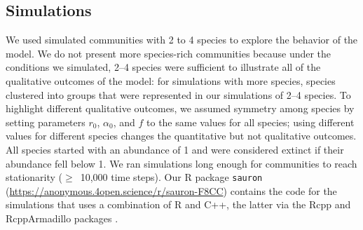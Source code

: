 \subsection*{Simulations}

We used simulated communities with 2 to 4 species to explore the behavior 
of the model. We do not present more species-rich communities because under 
the conditions we simulated, 2--4 species were sufficient to illustrate all 
of the qualitative outcomes of the model: for simulations with more species,
species clustered into groups that were represented in our simulations of 
2--4 species. To highlight different qualitative outcomes, we assumed
symmetry among species by setting parameters $r_{0}$, $\alpha_{0}$,
and $f$ to the same values for all species; using different values for
different species changes the quantitative but not qualitative outcomes.
All species started with an abundance of 1 and were considered extinct
if their abundance fell below 1. We ran simulations long enough for
communities to reach stationarity ($\ge$~10,000 time steps). 
Our R package
\texttt{sauron}
(\url{https://anonymous.4open.science/r/sauron-F8CC}) 
contains the code for the simulations that uses a combination of R
\citep{RCoreTeam2022} and C++, the latter via the Rcpp and
RcppArmadillo packages \citep{Eddelbuettel2014a, Eddelbuettel2013a,
Sanderson2016}.


